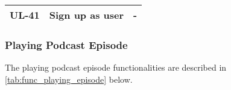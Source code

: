 \documentclass[../report.tex]{subfiles}
\begin{document}
\begin{longtable}[c]{|l|l|l|}
  \rowcolor[HTML]{FAFAFA} 
  UL-41                                                        & Sign up as user                                                                                                                                      & -                                                                                                                                                                                                                                                                                                                                                                          \\ \hline
\end{longtable}

\subsubsection{Playing Podcast Episode}

The playing podcast episode functionalities are described in \cref{tab:func_playing_episode} below.
\end{document}
